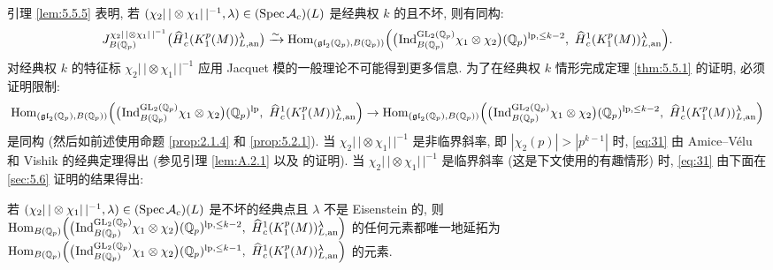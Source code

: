 引理 \ref{lem:5.5.5} 表明, 若 $(\chi_2|\,| \otimes \chi_1|\,|^{-1},\lambda) \in (\operatorname{Spec} \mathcal{A}_c)(L)$ 是经典权 $k$ 的且不坏, 则有同构:
\[
J_{B(\Qp)}^{\chi_2|\,| \otimes \chi_1|\,|^{-1}}\bigl(\widehat{H}{}_{c}^{1}(K_1^{p}(M))_{L,\mathrm{an}}^{\lambda}\bigr)
\xrightarrow{\sim} \Hom_{(\mathfrak{gl}_2(\Qp),B(\Qp))}\Bigl(\bigl(\pind{}_{B(\Qp)}^{\GL_2(\Qp)} \chi_1 \otimes \chi_2\bigr)(\Qp)^{\mathrm{lp},\le k-2},\ \widehat{H}{}_{c}^{1}(K_1^{p}(M))_{L,\mathrm{an}}^{\lambda}\Bigr).
\]
对经典权 $k$ 的特征标 $\chi_2|\,| \otimes \chi_1|\,|^{-1}$ 应用 Jacquet 模的一般理论不可能得到更多信息.
为了在经典权 $k$ 情形完成定理 \ref{thm:5.5.1} 的证明, 必须证明限制:
\begin{equation}
\label{eq:31}
\Hom_{(\mathfrak{gl}_2(\Qp),B(\Qp))}\Bigl(\bigl(\pind{}_{B(\Qp)}^{\GL_2(\Qp)} \chi_1 \otimes \chi_2\bigr)(\Qp)^{\mathrm{lp}},\ \widehat{H}{}_{c}^{1}(K_1^{p}(M))_{L,\mathrm{an}}^{\lambda}\Bigr)
\to \Hom_{(\mathfrak{gl}_2(\Qp),B(\Qp))}\Bigl(\bigl(\pind{}_{B(\Qp)}^{\GL_2(\Qp)} \chi_1 \otimes \chi_2\bigr)(\Qp)^{\mathrm{lp},\le k-2},\ \widehat{H}{}_{c}^{1}(K_1^{p}(M))_{L,\mathrm{an}}^{\lambda}\Bigr)
\end{equation}
是同构 (然后如前述使用命题 \ref{prop:2.1.4} 和 \ref{prop:5.2.1}).
当 $\chi_2|\,| \otimes \chi_1|\,|^{-1}$ 是非临界斜率, 即 $|\chi_2(p)| > |p^{k-1}|$ 时, \eqref{eq:31} 由 Amice--V\'elu 和 Vishik 的经典定理得出 (参见引理 \ref{lem:A.2.1} 以及 \cite[Prop.~2.5]{ref:25} 的证明).
当 $\chi_2|\,| \otimes \chi_1|\,|^{-1}$ 是临界斜率 (这是下文使用的有趣情形) 时, \eqref{eq:31} 由下面在 \ref{sec:5.6} 证明的结果得出:

\setcounter{theorem}{3}
\begin{proposition}\label{prop:5.5.4}
若 $(\chi_2|\,| \otimes \chi_1|\,|^{-1},\lambda) \in (\operatorname{Spec} \mathcal{A}_c)(L)$ 是不坏的经典点且 $\lambda$ 不是 Eisenstein 的, 则 $\Hom_{B(\Qp)}\Bigl(\bigl(\pind{}_{B(\Qp)}^{\GL_2(\Qp)} \chi_1 \otimes \chi_2\bigr)(\Qp)^{\mathrm{lp},\le k-2},\ \widehat{H}{}_{c}^{1}(K_1^{p}(M))_{L,\mathrm{an}}^{\lambda}\Bigr)$ 的任何元素都唯一地延拓为 $\Hom_{B(\Qp)}\Bigl(\bigl(\pind{}_{B(\Qp)}^{\GL_2(\Qp)} \chi_1 \otimes \chi_2\bigr)(\Qp)^{\mathrm{lp},\le k-1},\ \widehat{H}{}_{c}^{1}(K_1^{p}(M))_{L,\mathrm{an}}^{\lambda}\Bigr)$ 的元素.
\end{proposition}

